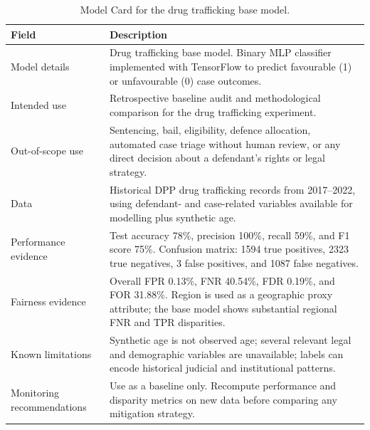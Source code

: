 \documentclass[fleqn,10pt]{wlscirep}
\begin{document}
\begin{table}[!htb]
\centering
\begin{tabular}{|p{3.5cm}|p{11cm}|}
\hline
\textbf{Field} & \textbf{Description} \\ \hline
Model details & Drug trafficking base model. Binary MLP classifier implemented with TensorFlow to predict favourable (1) or unfavourable (0) case outcomes. \\ \hline
Intended use & Retrospective baseline audit and methodological comparison for the drug trafficking experiment. \\ \hline
Out-of-scope use & Sentencing, bail, eligibility, defence allocation, automated case triage without human review, or any direct decision about a defendant's rights or legal strategy. \\ \hline
Data & Historical DPP drug trafficking records from 2017--2022, using defendant- and case-related variables available for modelling plus synthetic age. \\ \hline
Performance evidence & Test accuracy 78\%, precision 100\%, recall 59\%, and F1 score 75\%. Confusion matrix: 1594 true positives, 2323 true negatives, 3 false positives, and 1087 false negatives. \\ \hline
Fairness evidence & Overall FPR 0.13\%, FNR 40.54\%, FDR 0.19\%, and FOR 31.88\%. Region is used as a geographic proxy attribute; the base model shows substantial regional FNR and TPR disparities. \\ \hline
Known limitations & Synthetic age is not observed age; several relevant legal and demographic variables are unavailable; labels can encode historical judicial and institutional patterns. \\ \hline
Monitoring recommendations & Use as a baseline only. Recompute performance and disparity metrics on new data before comparing any mitigation strategy. \\ \hline
\end{tabular}
\caption{Model Card for the drug trafficking base model.}
\label{tab:model_card_dt_base}
\end{table}
\end{document}
